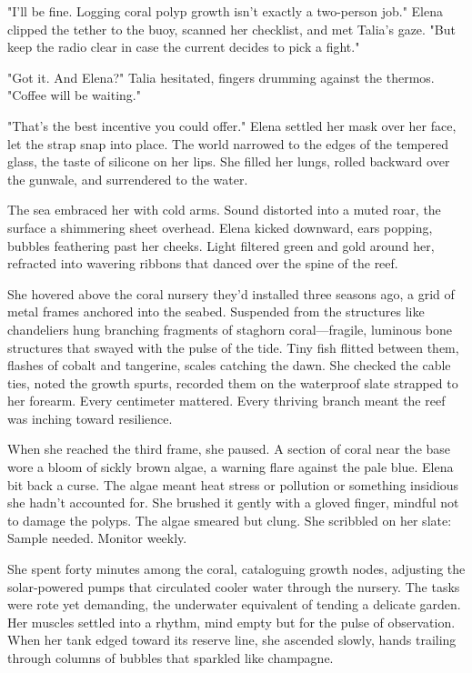 "I'll be fine. Logging coral polyp growth isn't exactly a two-person job." Elena clipped the tether to the buoy, scanned her checklist, and met Talia's gaze. "But keep the radio clear in case the current decides to pick a fight."

"Got it. And Elena?" Talia hesitated, fingers drumming against the thermos. "Coffee will be waiting."

"That's the best incentive you could offer." Elena settled her mask over her face, let the strap snap into place. The world narrowed to the edges of the tempered glass, the taste of silicone on her lips. She filled her lungs, rolled backward over the gunwale, and surrendered to the water.

The sea embraced her with cold arms. Sound distorted into a muted roar, the surface a shimmering sheet overhead. Elena kicked downward, ears popping, bubbles feathering past her cheeks. Light filtered green and gold around her, refracted into wavering ribbons that danced over the spine of the reef.

She hovered above the coral nursery they'd installed three seasons ago, a grid of metal frames anchored into the seabed. Suspended from the structures like chandeliers hung branching fragments of staghorn coral—fragile, luminous bone structures that swayed with the pulse of the tide. Tiny fish flitted between them, flashes of cobalt and tangerine, scales catching the dawn. She checked the cable ties, noted the growth spurts, recorded them on the waterproof slate strapped to her forearm. Every centimeter mattered. Every thriving branch meant the reef was inching toward resilience.

When she reached the third frame, she paused. A section of coral near the base wore a bloom of sickly brown algae, a warning flare against the pale blue. Elena bit back a curse. The algae meant heat stress or pollution or something insidious she hadn't accounted for. She brushed it gently with a gloved finger, mindful not to damage the polyps. The algae smeared but clung. She scribbled on her slate: Sample needed. Monitor weekly.

She spent forty minutes among the coral, cataloguing growth nodes, adjusting the solar-powered pumps that circulated cooler water through the nursery. The tasks were rote yet demanding, the underwater equivalent of tending a delicate garden. Her muscles settled into a rhythm, mind empty but for the pulse of observation. When her tank edged toward its reserve line, she ascended slowly, hands trailing through columns of bubbles that sparkled like champagne.

